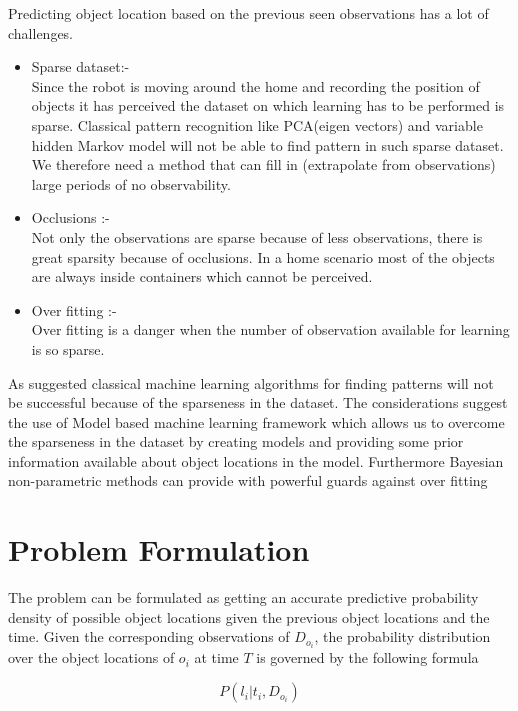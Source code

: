 

\FloatBarrier
Predicting object location based on the previous seen observations has a lot of challenges. 
\begin{itemize}
	\item  Sparse dataset:-\\
Since the robot is moving around the home and recording the position of objects it has perceived the dataset on which learning has to be performed is sparse. Classical pattern recognition like PCA(eigen vectors)
and variable hidden Markov model will not be able to find pattern in such
sparse dataset. We therefore need a method that can fill in (extrapolate from
observations) large periods of no observability.
    \item Occlusions :- \\
Not only the observations are sparse because of less observations, there is great
sparsity because of occlusions. In a home scenario most of the objects are
always inside containers which cannot be perceived.
    \item Over fitting :- \\
Over fitting is a danger when the number of observation available for learning
is so sparse.
\end{itemize}

As suggested classical machine learning algorithms for finding patterns will not be successful because of the sparseness in the dataset.
The considerations suggest the use of Model based machine learning framework   which allows us to overcome the sparseness in the dataset by creating models and providing some prior information available about object locations in the model.
Furthermore Bayesian non-parametric methods can provide with powerful guards
against over fitting

\section{Problem Formulation}
\label{sec:Problem formulation}

The problem can be formulated as getting an accurate predictive probability density of possible object locations given the previous object locations and the time. Given the corresponding observations of $D_{o_i}$, the probability distribution over the object locations of $o_i$ at time $T$ is governed by the following formula 

    \begin{equation} \label{eq:1}
	    P(l_i | t_i, D_{o_i})
    \end{equation}

